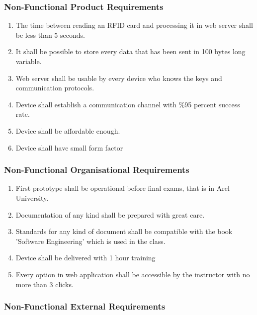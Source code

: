 \documentclass{scrreprt}
\begin{document}
\subsubsection{Non-Functional Product Requirements}

\begin{enumerate}[leftmargin=5\parindent, label=NFP-\arabic*:]

\item  The time between reading an RFID card and processing it in web server shall be less than 5 seconds.
\item  It shall be possible to store every data that has been sent in 100 bytes long variable.
\item  Web server shall be usable by every device who knows the keys and communication protocols.
\item  Device shall establish a communication channel with \%95 percent success rate. 
\item  Device shall be affordable enough.
\item  Device shall have small form factor

\end{enumerate}

\subsubsection{Non-Functional Organisational Requirements}

\begin{enumerate}[leftmargin=5\parindent, label=NFO-\arabic*:]

\item  First prototype shall be operational before final exams, that is in Arel University.
\item  Documentation of any kind shall be prepared with great care.
\item  Standards for any kind of document shall be compatible with the book 'Software Engineering' which is used in the class.
\item  Device shall be delivered with 1 hour training
\item  Every option in web application shall be accessible by the instructor with no more than 3 clicks.

\end{enumerate}

\subsubsection{Non-Functional External Requirements}
\end{document}
